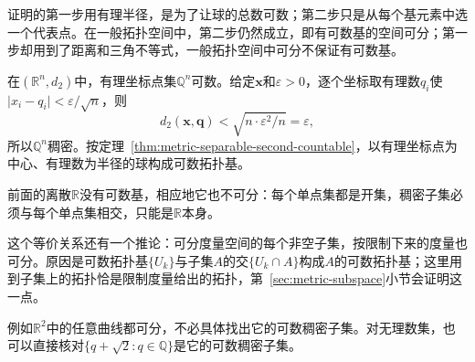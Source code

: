 证明的第一步用有理半径，是为了让球的总数可数；第二步只是从每个基元素中选一个代表点。在一般拓扑空间中，第二步仍然成立，即有可数基的空间可分；第一步却用到了距离和三角不等式，一般拓扑空间中可分不保证有可数基。

\begin{example}[欧氏空间的可数基]
\label{ex:metric-rn-separable}
在$(\mathbb R^n,d_2)$中，有理坐标点集$\mathbb Q^n$可数。给定$\bm x$和$\varepsilon>0$，逐个坐标取有理数$q_i$使$\lvert x_i-q_i\rvert<\varepsilon/\sqrt n$，则
\[
d_2(\bm x,\bm q)<\sqrt{n\cdot\varepsilon^2/n}=\varepsilon,
\]
所以$\mathbb Q^n$稠密。按定理~\ref{thm:metric-separable-second-countable}，以有理坐标点为中心、有理数为半径的球构成可数拓扑基。

前面的离散$\mathbb R$没有可数基，相应地它也不可分：每个单点集都是开集，稠密子集必须与每个单点集相交，只能是$\mathbb R$本身。
\end{example}

这个等价关系还有一个推论：可分度量空间的每个非空子集，按限制下来的度量也可分。原因是可数拓扑基$\{U_k\}$与子集$A$的交$\{U_k\cap A\}$构成$A$的可数拓扑基；这里用到子集上的拓扑恰是限制度量给出的拓扑，第~\ref{sec:metric-subspace}小节会证明这一点。

例如$\mathbb R^2$中的任意曲线都可分，不必具体找出它的可数稠密子集。对无理数集，也可以直接核对$\{q+\sqrt2:q\in\mathbb Q\}$是它的可数稠密子集。
